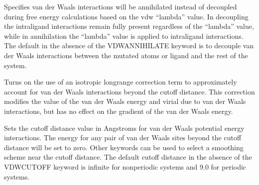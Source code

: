 \documentclass[letterpaper,11pt,english]{sphinxmanual}
\begin{document}
\ignorespaces {}\label{\detokenize{text/keywords:key-vdw-annihilate}}\begin{description}
\sphinxAtStartPar
Specifies van der Waals interactions will be annihilated instead of decoupled during free energy calculations based on the vdw “lambda” value. In decoupling the intra\sphinxhyphen{}ligand interactions remain fully present regardless of the “lambda” value, while in annihilation the “lambda” value is applied to intra\sphinxhyphen{}ligand interactions. The default in the absence of the VDW\sphinxhyphen{}ANNIHILATE keyword is to decouple van der Waals interactions between the mutated atoms or ligand and the rest of the system.

\end{description}

\ignorespaces {}\label{\detokenize{text/keywords:key-vdw-correction}}\begin{description}
\sphinxAtStartPar
Turns on the use of an isotropic long\sphinxhyphen{}range correction term to approximately account for van der Waals interactions beyond the cutoff distance. This correction modifies the value of the van der Waals energy and virial due to van der Waals interactions, but has no effect on the gradient of the van der Waals energy.

\end{description}

\ignorespaces {}\label{\detokenize{text/keywords:key-vdw-cutoff}}\begin{description}
\sphinxAtStartPar
Sets the cutoff distance value in Angstroms for van der Waals potential energy interactions. The energy for any pair of van der Waals sites beyond the cutoff distance will be set to zero. Other keywords can be used to select a smoothing scheme near the cutoff distance. The default cutoff distance in the absence of the VDW\sphinxhyphen{}CUTOFF keyword is infinite for nonperiodic systems and 9.0 for periodic systems.

\end{description}
\end{document}
